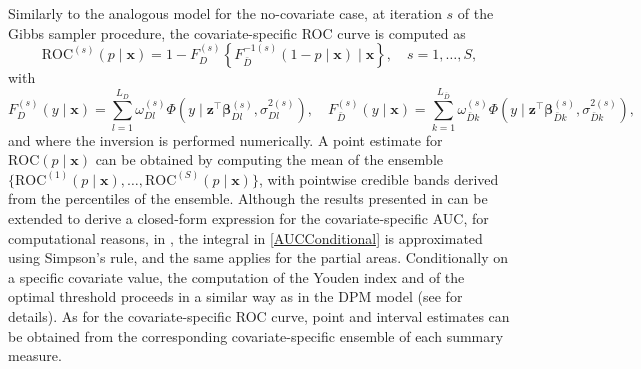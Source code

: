 Similarly to the analogous model for the no-covariate case, at iteration $s$ of the Gibbs sampler procedure, the covariate-specific ROC curve is computed as
\begin{equation*} 
\text{ROC}^{(s)}(p\mid\mathbf{x})=1-F_D^{(s)}\left\{F_{\bar{D}}^{-1(s)}(1-p\mid\mathbf{x})\mid\mathbf{x}\right\},  \quad s=1,\ldots, S,
\end{equation*}
with
\begin{equation}\label{cdfdpm} 
F_D^{(s)}(y\mid\mathbf{x})=\sum_{l=1}^{L_D}\omega_{Dl}^{(s)}\Phi\left(y\mid \mathbf{z}^{\top}\boldsymbol{\beta}_{Dl}^{(s)},\sigma_{Dl}^{2(s)}\right),\quad
F_{\bar{D}}^{(s)}(y\mid\mathbf{x})=\sum_{k=1}^{L_{\bar{D}}}\omega_{\bar{D}k}^{(s)}\Phi\left(y\mid\mathbf{z}^{\top}\boldsymbol{\beta}_{\bar{D}k}^{(s)},\sigma_{\bar{D}k}^{2(s)}\right),
\end{equation}
and where the inversion is performed numerically. A point estimate for $\text{ROC}(p\mid\mathbf{x})$ can be obtained by computing the mean of the ensemble $\{\text{ROC}^{(1)}(p\mid\mathbf{x}),\ldots,\text{ROC}^{(S)}(p\mid\mathbf{x})\}$, with pointwise credible bands derived from the percentiles of the ensemble. Although the results presented in \cite{Erkanli2006} can be extended to derive a closed-form expression for the covariate-specific AUC, for computational reasons, in , the integral in \eqref{AUCConditional} is approximated using Simpson's rule, and the same applies for the partial areas. Conditionally on a specific covariate value, the computation of the Youden index and of the optimal threshold proceeds in a similar way as in the DPM model (see \citealp{Inacio17} for details). As for the covariate-specific ROC curve, point and interval estimates can be obtained from the corresponding covariate-specific ensemble of each summary measure.

